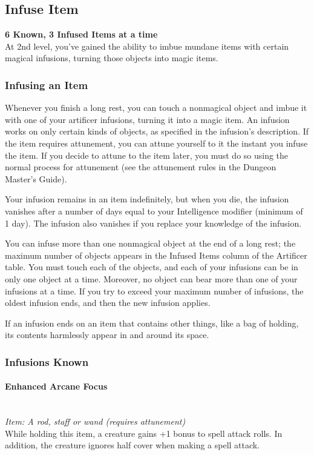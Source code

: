 \documentclass[letterpaper,openany,oneside,twocolumn]{book}
\begin{document}
\subsection*{Infuse Item}
\textbf{6 Known, 3 Infused Items at a time}\\
At 2nd level, you've gained the ability to imbue mundane items with certain magical infusions, turning those objects into magic items.
\subsubsection*{Infusing an Item}
Whenever you finish a long rest, you can touch a nonmagical object and imbue it with one of your artificer infusions, turning it into a magic item. An infusion works on only certain kinds of objects, as specified in the infusion's description. If the item requires attunement, you can attune yourself to it the instant you infuse the item. If you decide to attune to the item later, you must do so using the normal process for attunement (see the attunement rules in the Dungeon Master's Guide).

Your infusion remains in an item indefinitely, but when you die, the infusion vanishes after a number of days equal to your Intelligence modifier (minimum of 1 day). The infusion also vanishes if you replace your knowledge of the infusion.

You can infuse more than one nonmagical object at the end of a long rest; the maximum number of objects appears in the Infused Items column of the Artificer table. You must touch each of the objects, and each of your infusions can be in only one object at a time. Moreover, no object can bear more than one of your infusions at a time. If you try to exceed your maximum number of infusions, the oldest infusion ends, and then the new infusion applies.

If an infusion ends on an item that contains other things, like a bag of holding, its contents harmlessly appear in and around its space.
\subsubsection*{Infusions Known}
\paragraph*{Enhanced Arcane Focus}\hfill\\
\textit{Item: A rod, staff or wand (requires attunement)}\\
While holding this item, a creature gains +1 bonus to spell attack rolls. In addition, the creature ignores half cover when making a spell attack.
\end{document}
